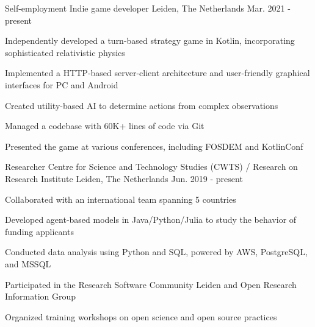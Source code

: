 

\begin{cventries}

  \cventry
    {Self-employment} %
    {Indie game developer} %
    {Leiden, The Netherlands} %
    {Mar. 2021 - present} %
    {
      \begin{cvitems} %
        \item{Independently developed a turn-based strategy game in Kotlin, incorporating sophisticated relativistic physics}
        \item{Implemented a HTTP-based server-client architecture and user-friendly graphical interfaces for PC and Android}
        \item{Created utility-based AI to determine actions from complex observations}
        \item{Managed a codebase with 60K+ lines of code via Git}
        \item{Presented the game at various conferences, including FOSDEM and KotlinConf}
      \end{cvitems}
    }

  \cventry
    {Researcher} %
    {Centre for Science and Technology Studies (CWTS) / Research on Research Institute} %
    {Leiden, The Netherlands} %
    {Jun. 2019 - present} %
    {
      \begin{cvitems} %
        \item{Collaborated with an international team spanning 5 countries}
        \item{Developed agent-based models in Java/Python/Julia to study the behavior of funding applicants}
        \item{Conducted data analysis using Python and SQL, powered by AWS, PostgreSQL, and MSSQL}
        \item{Participated in the Research Software Community Leiden and Open Research Information Group}
        \item{Organized training workshops on open science and open source practices}
      \end{cvitems}
    }



\end{cventries}
